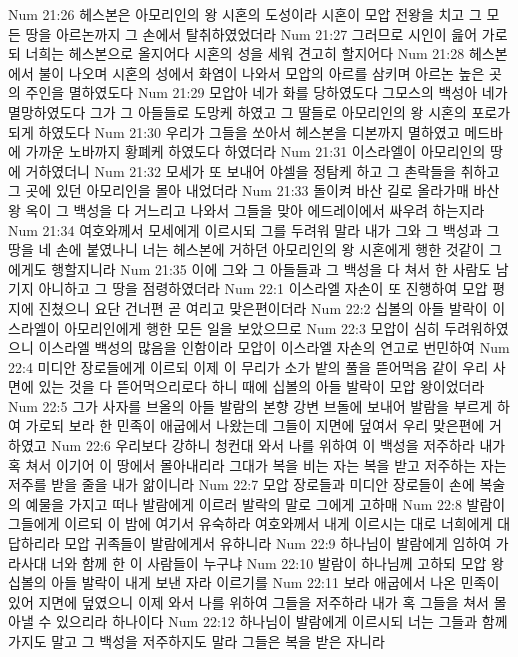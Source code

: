 Num 21:26  헤스본은 아모리인의 왕 시혼의 도성이라 시혼이 모압 전왕을 치고 그 모든 땅을 아르논까지 그 손에서 탈취하였었더라
Num 21:27  그러므로 시인이 읊어 가로되 너희는 헤스본으로 올지어다 시혼의 성을 세워 견고히 할지어다
Num 21:28  헤스본에서 불이 나오며 시혼의 성에서 화염이 나와서 모압의 아르를 삼키며 아르논 높은 곳의 주인을 멸하였도다
Num 21:29  모압아 네가 화를 당하였도다 그모스의 백성아 네가 멸망하였도다 그가 그 아들들로 도망케 하였고 그 딸들로 아모리인의 왕 시혼의 포로가 되게 하였도다
Num 21:30  우리가 그들을 쏘아서 헤스본을 디본까지 멸하였고 메드바에 가까운 노바까지 황폐케 하였도다 하였더라
Num 21:31  이스라엘이 아모리인의 땅에 거하였더니
Num 21:32  모세가 또 보내어 야셀을 정탐케 하고 그 촌락들을 취하고 그 곳에 있던 아모리인을 몰아 내었더라
Num 21:33  돌이켜 바산 길로 올라가매 바산 왕 옥이 그 백성을 다 거느리고 나와서 그들을 맞아 에드레이에서 싸우려 하는지라
Num 21:34  여호와께서 모세에게 이르시되 그를 두려워 말라 내가 그와 그 백성과 그 땅을 네 손에 붙였나니 너는 헤스본에 거하던 아모리인의 왕 시혼에게 행한 것같이 그에게도 행할지니라
Num 21:35  이에 그와 그 아들들과 그 백성을 다 쳐서 한 사람도 남기지 아니하고 그 땅을 점령하였더라
Num 22:1  이스라엘 자손이 또 진행하여 모압 평지에 진쳤으니 요단 건너편 곧 여리고 맞은편이더라
Num 22:2  십볼의 아들 발락이 이스라엘이 아모리인에게 행한 모든 일을 보았으므로
Num 22:3  모압이 심히 두려워하였으니 이스라엘 백성의 많음을 인함이라 모압이 이스라엘 자손의 연고로 번민하여
Num 22:4  미디안 장로들에게 이르되 이제 이 무리가 소가 밭의 풀을 뜯어먹음 같이 우리 사면에 있는 것을 다 뜯어먹으리로다 하니 때에 십볼의 아들 발락이 모압 왕이었더라
Num 22:5  그가 사자를 브올의 아들 발람의 본향 강변 브돌에 보내어 발람을 부르게 하여 가로되 보라 한 민족이 애굽에서 나왔는데 그들이 지면에 덮여서 우리 맞은편에 거하였고
Num 22:6  우리보다 강하니 청컨대 와서 나를 위하여 이 백성을 저주하라 내가 혹 쳐서 이기어 이 땅에서 몰아내리라 그대가 복을 비는 자는 복을 받고 저주하는 자는 저주를 받을 줄을 내가 앎이니라
Num 22:7  모압 장로들과 미디안 장로들이 손에 복술의 예물을 가지고 떠나 발람에게 이르러 발락의 말로 그에게 고하매
Num 22:8  발람이 그들에게 이르되 이 밤에 여기서 유숙하라 여호와께서 내게 이르시는 대로 너희에게 대답하리라 모압 귀족들이 발람에게서 유하니라
Num 22:9  하나님이 발람에게 임하여 가라사대 너와 함께 한 이 사람들이 누구냐
Num 22:10  발람이 하나님께 고하되 모압 왕 십볼의 아들 발락이 내게 보낸 자라 이르기를
Num 22:11  보라 애굽에서 나온 민족이 있어 지면에 덮였으니 이제 와서 나를 위하여 그들을 저주하라 내가 혹 그들을 쳐서 몰아낼 수 있으리라 하나이다
Num 22:12  하나님이 발람에게 이르시되 너는 그들과 함께 가지도 말고 그 백성을 저주하지도 말라 그들은 복을 받은 자니라
